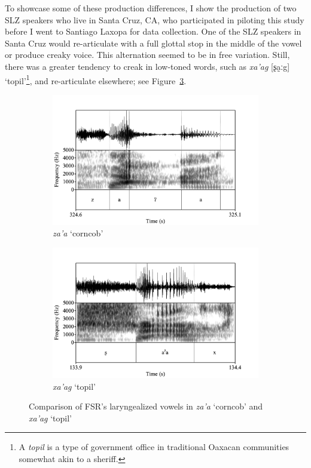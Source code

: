 \documentclass[12pt, letterpaper]{article}
\begin{document}
To showcase some of these production differences, I show the production of two SLZ speakers who live in Santa Cruz, CA, who participated in piloting this study before I went to Santiago Laxopa for data collection. One of the SLZ speakers in Santa Cruz would re-articulate with a full glottal stop in the middle of the vowel or produce creaky voice. This alternation seemed to be in free variation. Still, there was a greater tendency to creak in low-toned words, such as \textit{xa'ag} [ʂa̰ːg] `topil'\footnote{A \textit{topil} is a type of government office in traditional Oaxacan communities somewhat akin to a sheriff.}, and re-articulate elsewhere; see Figure~\ref{fig:FSRLaryngeal}.

\begin{figure}[!h]
	\centering
	\begin{subfigure}{.5\textwidth}
		\centering
		\includegraphics[width=\linewidth]{Images/za'a.png}
		\caption{\textit{za'a} `corncob'}
		\label{fig:FSRza'a}
	\end{subfigure}%
	\begin{subfigure}{.5\textwidth}
		\centering
		\includegraphics[width=\linewidth]{Images/xa'ag.png}
		\caption{\textit{xa'ag} `topil'}
		\label{fig:FSRxa'ag}
	\end{subfigure}	
	\caption{Comparison of FSR's laryngealized vowels in \textit{za'a} `corncob' and \textit{xa'ag} `topil'}
	\label{fig:FSRLaryngeal}
\end{figure}
\end{document}
